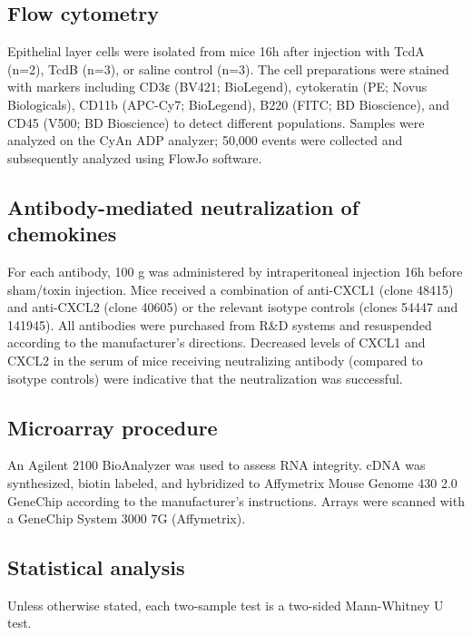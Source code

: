 \subsection{ Flow cytometry }
Epithelial layer cells were isolated from mice 16h after injection with TcdA (n=2), TcdB (n=3), or saline control (n=3). The cell preparations were stained with markers including CD3ε (BV421; BioLegend), cytokeratin (PE; Novus Biologicals), CD11b (APC-Cy7; BioLegend), B220 (FITC; BD Bioscience), and CD45 (V500; BD Bioscience) to detect different populations.  Samples were analyzed on the CyAn ADP analyzer; 50,000 events were collected and subsequently analyzed using FlowJo software.  

\subsection{Antibody-mediated neutralization of chemokines}
For each antibody, 100 \textmu{}g was administered by intraperitoneal injection 16h before sham/toxin injection. Mice received a combination of anti-CXCL1 (clone 48415) and anti-CXCL2 (clone 40605) or the relevant isotype controls (clones 54447 and 141945). All antibodies were purchased from R\&{}D systems and resuspended according to the manufacturer’s directions. Decreased levels of CXCL1 and CXCL2 in the serum of mice receiving neutralizing antibody (compared to isotype controls) were indicative that the neutralization was successful.

\subsection{ Microarray procedure }
An Agilent 2100 BioAnalyzer was used to assess RNA integrity. cDNA was synthesized, biotin labeled, and hybridized to Affymetrix Mouse Genome 430 2.0 GeneChip according to the manufacturer’s instructions. Arrays were scanned with a GeneChip System 3000 7G (Affymetrix).

\subsection{ Statistical analysis }
Unless otherwise stated, each two-sample test is a two-sided Mann-Whitney U test.

